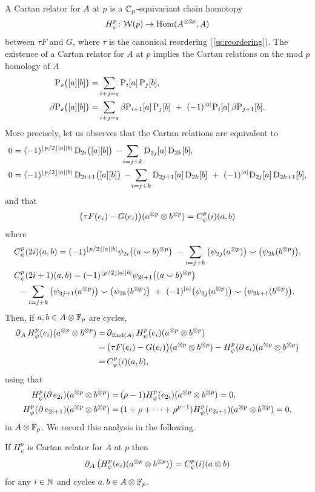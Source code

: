 A Cartan relator for $A$ at $p$ is a $\mathbb{C}_p$-equivariant chain homotopy
\[
H_\psi^p \colon \mathcal{W}(p) \to \mathrm{Hom}(A^{\otimes 2p}, A)
\]
between $\tau F$ and $G$, where $\tau$ is the canonical reordering (\cref{ss:reordering}).
The existence of a Cartan relator for $A$ at $p$ implies the Cartan relations on the mod $p$ homology of $A$
\begin{align*}
	\mathrm{P}_s\big([a][b]\big) =&
	\sum_{i+j=s} \mathrm{P}_i[a] \, \mathrm{P}_j[b], \\
	\beta\mathrm{P}_s\big([a][b]\big) =&
	\sum_{i+j=s} \beta\mathrm{P}_{i+1}[a] \, \mathrm{P}_j[b] \ +\ (-1)^{\lvert a\rvert} \mathrm{P}_i[a] \, \beta\mathrm{P}_{j+1}[b].
\end{align*}
More precisely, let us observes that the Cartan relations are equivalent to
\begin{align*}
	0 &= (-1)^{\floor{p/2}\bars{a}\bars{b}} \, \rD_{2i}\big([a][b]\big) \,-\!
	\sum_{i=j+k} \rD_{2j}[a] \, \rD_{2k}[b], \\
	0 &= (-1)^{\floor{p/2}\bars{a}\bars{b}} \, \rD_{2i+1}\big([a][b]\big) \,-\!
	\sum_{i=j+k} \rD_{2j+1}[a] \, \rD_{2k}[b] \ +\ (-1)^{\bars{a}}\rD_{2j}[a] \, \rD_{2k+1}[b],
\end{align*}
and that
\[
\big(\tau F(e_i) - G(e_i)\big)(a^{\otimes p} \otimes b^{\otimes p}) = C^p_\psi(i)(a,b)
\]
where
\begin{multline*}
	C_\psi^p(2i)(a,b) = (-1)^{\floor{p/2}\bars{a}\bars{b}} \psi_{2i}\big((a \smallsmile b)^{\ot p}\big) \ -
	\sum_{i=j+k}\big(\psi_{2j}(a^{\ot p})\big) \smallsmile \big(\psi_{2k}(b^{\ot p})\big), \hfill \\
	C_\psi^p(2i+1)(a,b) = (-1)^{\floor{p/2}\bars{a}\bars{b}} \psi_{2i+1}\big((a \smallsmile b)^{\ot p}\big) \hfill \\ -
	\sum_{i=j+k} \big(\psi_{2j+1}(a^{\ot p})\big) \smallsmile \big(\psi_{2k}(b^{\ot p})\big)\ +\
	(-1)^{\bars{a}}\big(\psi_{2j}(a^{\ot p})\big) \smallsmile \big(\psi_{2k+1}(b^{\ot p})\big).
\end{multline*}
Then, if $a,b \in A \otimes {\mathbb{F}_p}$ are cycles,
\begin{align*}
	\operatorname{\partial}_A H_\psi^p(e_i)(a^{\otimes p} \otimes b^{\otimes p}) =&
	\operatorname{\partial}_{\mathrm{End}(A)} H_\psi^p(e_i)(a^{\otimes p} \otimes b^{\otimes p}) \\ =& \,
	\big(\tau F(e_i) - G(e_i)\big)(a^{\otimes p} \otimes b^{\otimes p}) -
	H_\psi^p(\operatorname{\partial} e_i)(a^{\otimes p} \otimes b^{\otimes p}) \\ =&\,
	C^p_\psi(i)(a,b),
\end{align*}
using that
\begin{align*}
	H_\psi^p(\operatorname{\partial} e_{2i})(a^{\otimes p} \otimes b^{\otimes p}) =&\,
	(\rho - 1) H_\psi^p(e_{2i})(a^{\otimes p} \otimes b^{\otimes p}) = 0, \\
	H_\psi^p(\operatorname{\partial} e_{2i+1})(a^{\otimes p} \otimes b^{\otimes p}) =&\,
	(1+\rho+\dots+\rho^{p-1}) H_\psi^p(e_{2i+1})(a^{\otimes p} \otimes b^{\otimes p}) = 0,
\end{align*}
in $A \otimes {\mathbb{F}_p}$.
We record this analysis in the following.
\begin{theorem*}
	If $H_\psi^p$ is Cartan relator for $A$ at $p$ then
	\[
	\operatorname{\partial}_A \big(H_\psi^p(e_i)(a^{\otimes p} \otimes b^{\otimes p})\big) = C_\psi^p(i)(a \otimes b)
	\]
	for any $i \in \mathbb{N}$ and cycles $a,b \in A \otimes {\mathbb{F}_p}$.
\end{theorem*}


